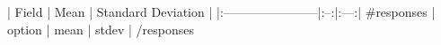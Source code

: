 | Field | Mean | Standard Deviation |
|:-----------------------|:--:|:---:|
{{#responses}}
| {{{option}}} | {{mean}} | {{stdev}} |
{{/responses}}